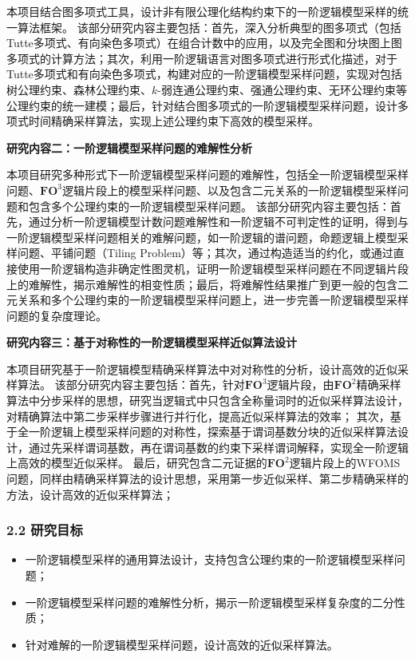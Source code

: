 \documentclass[12pt,UTF8,AutoFakeBold=3,a4paper]{ctexart} %
\newcommand{\fotwo}{\ensuremath{\mathbf{FO}^2}}
\newcommand{\fothree}{\ensuremath{\mathbf{FO}^3}}
\begin{document}
本项目结合图多项式工具，设计非有限公理化结构约束下的一阶逻辑模型采样的统一算法框架。
该部分研究内容主要包括：首先，深入分析典型的图多项式（包括Tutte多项式、有向染色多项式）在组合计数中的应用，以及完全图和分块图上图多项式的计算方法；其次，利用一阶逻辑语言对图多项式进行形式化描述，对于Tutte多项式和有向染色多项式，构建对应的一阶逻辑模型采样问题，实现对包括树公理约束、森林公理约束、$k$-弱连通公理约束、强通公理约束、无环公理约束等公理约束的统一建模；最后，针对结合图多项式的一阶逻辑模型采样问题，设计多项式时间精确采样算法，实现上述公理约束下高效的模型采样。

\textbf{研究内容二：一阶逻辑模型采样问题的难解性分析}

本项目研究多种形式下一阶逻辑模型采样问题的难解性，包括全一阶逻辑模型采样问题、\fothree{}逻辑片段上的模型采样问题、以及包含二元关系的一阶逻辑模型采样问题和包含多个公理约束的一阶逻辑模型采样问题。
该部分研究内容主要包括：首先，通过分析一阶逻辑模型计数问题难解性和一阶逻辑不可判定性的证明，得到与一阶逻辑模型采样问题相关的难解问题，如一阶逻辑的谱问题，命题逻辑上模型采样问题、平铺问题（Tiling Problem）等；其次，通过构造适当的约化，或通过直接使用一阶逻辑构造非确定性图灵机，证明一阶逻辑模型采样问题在不同逻辑片段上的难解性，揭示难解性的相变性质；最后，将难解性结果推广到更一般的包含二元关系和多个公理约束的一阶逻辑模型采样问题上，进一步完善一阶逻辑模型采样问题的复杂度理论。

\textbf{研究内容三：基于对称性的一阶逻辑模型采样近似算法设计}

本项目研究基于一阶逻辑模型精确采样算法中对对称性的分析，设计高效的近似采样算法。
该部分研究内容主要包括：首先，针对\fothree{}逻辑片段，由\fotwo{}精确采样算法中分步采样的思想，研究当逻辑式中只包含全称量词时的近似采样算法设计，对精确算法中第二步采样步骤进行并行化，提高近似采样算法的效率；
其次，基于全一阶逻辑上模型采样问题的对称性，探索基于谓词基数分块的近似采样算法设计，通过先采样谓词基数，再在谓词基数的约束下采样谓词解释，实现全一阶逻辑上高效的模型近似采样。
最后，研究包含二元证据的\fotwo{}逻辑片段上的WFOMS问题，同样由精确采样算法的设计思想，采用第一步近似采样、第二步精确采样的方法，设计高效的近似采样算法；

\subsubsection{2.2 研究目标}

\begin{itemize}
  \item 一阶逻辑模型采样的通用算法设计，支持包含公理约束的一阶逻辑模型采样问题；
  \item 一阶逻辑模型采样问题的难解性分析，揭示一阶逻辑模型采样复杂度的二分性质；
  \item 针对难解的一阶逻辑模型采样问题，设计高效的近似采样算法。
\end{itemize}
\end{document}
